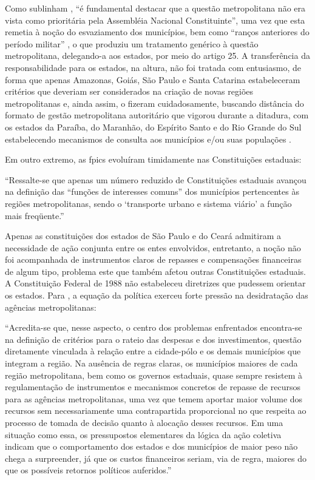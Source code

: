 	Como sublinham , ``é fundamental destacar que a questão metropolitana não era vista como prioritária pela Assembléia Nacional Constituinte'', uma vez que esta remetia à noção do esvaziamento dos municípios, bem como ``ranços anteriores do período militar'' , o que produziu um tratamento genérico à questão metropolitana, delegando-a aos estados, por meio do artigo 25. A transferência da responsabilidade para os estados, na altura, não foi tratada com entusiasmo, de forma que apenas Amazonas, Goiás, São Paulo e Santa Catarina estabeleceram critérios que deveriam ser considerados na criação de novas regiões metropolitanas e, ainda assim, o fizeram cuidadosamente, buscando distância do formato de gestão metropolitana autoritário que vigorou durante a ditadura, com os estados da Paraíba, do Maranhão, do Espírito Santo e do Rio Grande do Sul estabelecendo mecanismos de consulta aos municípios e/ou suas populações \cite[p. 102]{guia2015a}.
	
	Em outro extremo, as \gls{fpic}s evoluíram timidamente nas Constituições estaduais:
	
	\begin{citacao}
		``Ressalte-se que apenas um número reduzido de Constituições estaduais avançou na definição das “funções de interesses comuns” dos municípios pertencentes às regiões metropolitanas, sendo o `transporte urbano e sistema viário' a função mais freqüente.'' \cite[p. 102]{guia2015a}
	\end{citacao}

	Apenas as constituições dos estados de São Paulo e do Ceará admitiram a necessidade de ação conjunta entre os entes envolvidos, entretanto, a noção não foi acompanhada de instrumentos claros de repasses e compensações financeiras de algum tipo, problema este que também afetou outras Constituições estaduais. A Constituição Federal de 1988 não estabeleceu diretrizes que pudessem orientar os estados. Para , a equação da política exerceu forte pressão na desidratação das agências metropolitanas:
	
	\begin{citacao}
		``Acredita-se que, nesse aspecto, o centro dos problemas enfrentados encontra-se na definição de critérios para o rateio das despesas e dos investimentos, questão diretamente vinculada à relação entre a cidade-pólo e os demais municípios que integram a região. Na ausência de regras claras, os municípios maiores de cada região metropolitana, bem como os governos estaduais, quase sempre resistem à regulamentação de instrumentos e mecanismos concretos de repasse de recursos para as agências metropolitanas, uma vez que temem aportar maior volume dos recursos sem necessariamente uma contrapartida proporcional no que respeita ao processo de tomada de decisão quanto à alocação desses recursos. Em uma situação como essa, os pressupostos elementares da lógica da ação coletiva indicam que o comportamento dos estados e dos municípios de maior peso não chega a surpreender, já que os custos financeiros seriam, via de regra, maiores do que os possíveis retornos políticos auferidos.''
	\end{citacao}

